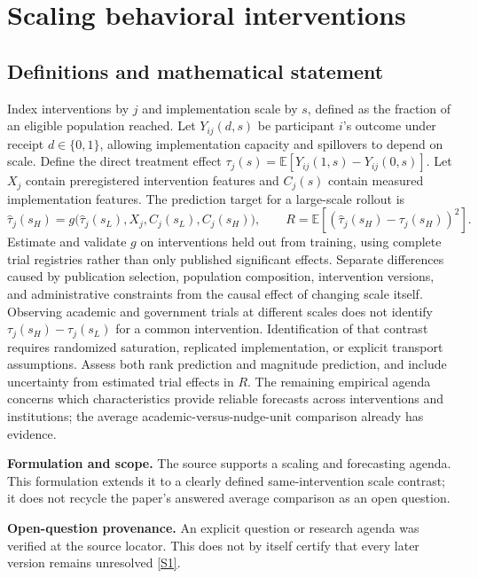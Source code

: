 \documentclass[11pt]{article}
\newcommand{\sref}[2]{\hyperlink{source:#1:#2}{[S#2]}}
\begin{document}
\section*{Scaling behavioral interventions}\label{30007590}
\subsection{Definitions and mathematical statement}
Index interventions by \(j\) and implementation scale by \(s\), defined as the fraction of an eligible population reached. Let \(Y_{ij}(d,s)\) be participant \(i\)'s outcome under receipt \(d\in\{0,1\}\), allowing implementation capacity and spillovers to depend on scale. Define the direct treatment effect \(\tau_j(s)=\mathbb E[Y_{ij}(1,s)-Y_{ij}(0,s)]\). Let \(X_j\) contain preregistered intervention features and \(C_j(s)\) contain measured implementation features. The prediction target for a large-scale rollout is
\[\widehat\tau_j(s_H)=g\bigl(\widehat\tau_j(s_L),X_j,C_j(s_L),C_j(s_H)\bigr),\qquad R=\mathbb E[(\widehat\tau_j(s_H)-\tau_j(s_H))^2].\]
Estimate and validate \(g\) on interventions held out from training, using complete trial registries rather than only published significant effects. Separate differences caused by publication selection, population composition, intervention versions, and administrative constraints from the causal effect of changing scale itself. Observing academic and government trials at different scales does not identify \(\tau_j(s_H)-\tau_j(s_L)\) for a common intervention. Identification of that contrast requires randomized saturation, replicated implementation, or explicit transport assumptions. Assess both rank prediction and magnitude prediction, and include uncertainty from estimated trial effects in \(R\). The remaining empirical agenda concerns which characteristics provide reliable forecasts across interventions and institutions; the average academic-versus-nudge-unit comparison already has evidence.

\par\textbf{Formulation and scope.} The source supports a scaling and forecasting agenda. This formulation extends it to a clearly defined same-intervention scale contrast; it does not recycle the paper’s answered average comparison as an open question.

\par\textbf{Open-question provenance.} An explicit question or research agenda was verified at the source locator. This does not by itself certify that every later version remains unresolved \sref{30007590}{1}.
\end{document}

